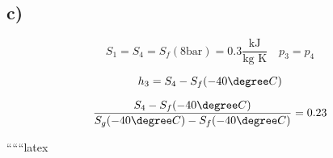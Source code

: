 

\subsection*{c)}

\[
S_1 = S_4 = S_f (8 \text{bar}) = 0.3 \frac{\text{kJ}}{\text{kg K}} \quad p_3 = p_4
\]

\[
h_3 = S_4 - S_f (-40\degree C)
\]

\[
\frac{S_4 - S_f (-40\degree C)}{S_g (-40\degree C) - S_f (-40\degree C)} = 0.23
\]

``````latex